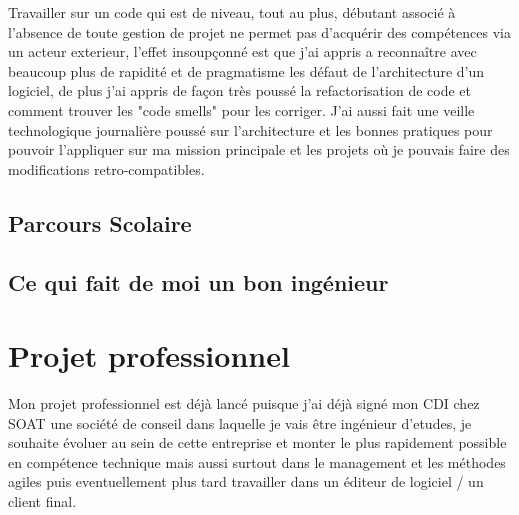 Travailler sur un code qui est de niveau, tout au plus, débutant associé à l'absence de toute 
gestion de projet ne permet pas d'acquérir des compétences via un acteur exterieur, 
l'effet insoupçonné est que j'ai appris a reconnaître avec beaucoup plus de rapidité 
et de pragmatisme les défaut de l'architecture d'un logiciel, de plus j'ai appris 
de façon très poussé la refactorisation de code et comment trouver les "code smells" pour 
les corriger. J'ai aussi fait une veille technologique journalière poussé sur l'architecture 
et les bonnes pratiques pour pouvoir l'appliquer sur ma mission principale et 
les projets où je pouvais faire des modifications retro-compatibles. 


\newpage

\subsection{Parcours Scolaire}


\subsection{Ce qui fait de moi un bon ingénieur}

\section{Projet professionnel}
Mon projet professionnel est déjà lancé puisque j'ai déjà signé mon CDI chez SOAT une 
société de conseil dans laquelle je vais être ingénieur d'etudes, je souhaite évoluer 
au sein de cette entreprise et monter le plus rapidement possible en compétence technique 
mais aussi surtout dans le management et les méthodes agiles
puis eventuellement plus tard travailler dans un éditeur de logiciel / un client final.